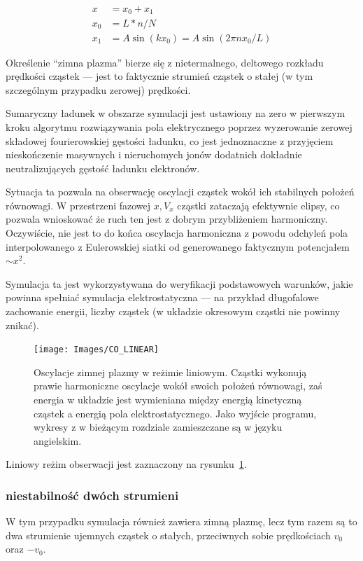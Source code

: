 \begin{align}
x &= x_0 + x_1\\
x_0 &= L * n / N\\
x_1 &= A  \sin(k x_0) = A \sin(2 \pi n x_0 / L)
\end{align}

Określenie ``zimna plazma'' bierze się z nietermalnego, deltowego
rozkładu prędkości cząstek --- jest to faktycznie strumień cząstek o stałej
(w tym szczególnym przypadku zerowej) prędkości.

Sumaryczny ładunek w obszarze symulacji jest ustawiony na zero w pierwszym
kroku algorytmu rozwiązywania pola elektrycznego poprzez wyzerowanie zerowej
składowej fourierowskiej gęstości ładunku, co jest jednoznaczne z przyjęciem
nieskończenie masywnych i nieruchomych jonów dodatnich dokładnie
neutralizujących gęstość ładunku elektronów.

Sytuacja ta
pozwala na obserwację oscylacji cząstek wokół ich stabilnych położeń
równowagi. W przestrzeni fazowej $x, V_x$ cząstki zataczają efektywnie
elipsy, co pozwala wnioskować że ruch ten jest z dobrym przybliżeniem harmoniczny.
Oczywiście, nie jest to do końca oscylacja harmoniczna z powodu odchyleń pola interpolowanego
z Eulerowskiej siatki od generowanego faktycznym potencjałem $ \sim x^2 $.


Symulacja ta jest wykorzystywana do weryfikacji podstawowych warunków, jakie powinna spełniać
symulacja elektrostatyczna --- na przykład długofalowe zachowanie energii, liczby cząstek (w układzie okresowym cząstki nie powinny
znikać).

\begin{figure}[h!]
  \texttt{[image: Images/CO\_LINEAR]}
  \caption{Oscylacje zimnej plazmy w reżimie liniowym. Cząstki wykonują prawie harmoniczne oscylacje wokół swoich położeń równowagi, zaś energia
   w układzie jest wymieniana między energią kinetyczną cząstek a energią pola
elektrostatycznego. Jako wyjście programu, wykresy z \pythonpic{} w bieżącym rozdziale zamieszczane są w języku angielskim.\label{fig:coldplasma-linear}}

\end{figure}

Liniowy reżim obserwacji jest zaznaczony na rysunku~\ref{fig:coldplasma-linear}.%

    \subsubsection{niestabilność dwóch strumieni}
W tym przypadku symulacja również zawiera zimną plazmę, lecz tym razem są to dwa strumienie ujemnych cząstek
o stałych, przeciwnych sobie prędkościach $v_0$ oraz $-v_0$.

